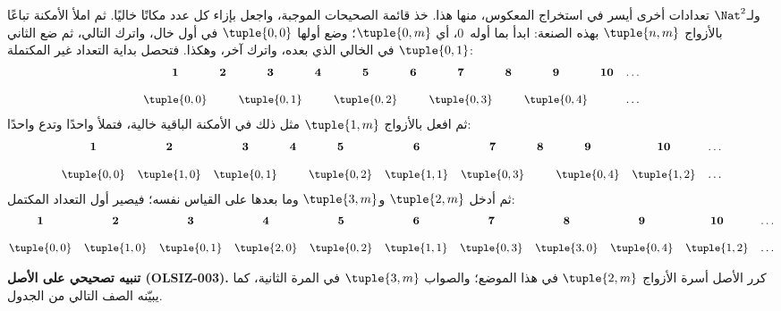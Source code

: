\documentclass[../../../include/open-logic-section]{subfiles}
\begin{document}


\begin{explain}
ولـ$\Nat^2$ تعدادات أخرى أيسر في استخراج المعكوس، منها هذا.
خذ قائمة الصحيحات الموجبة، واجعل بإزاء كل عدد مكانًا خاليًا.
ثم املأ الأمكنة تباعًا بالأزواج $\tuple{n,m}$ بهذه الصنعة:
ابدأ بما أوله~$0$، أي $\tuple{0,m}$؛ وضع أولها $\tuple{0,0}$
في أول خال، واترك التالي، ثم ضع الثاني $\tuple{0,1}$ في الخالي
الذي بعده، واترك آخر، وهكذا. فتحصل بداية التعداد غير المكتملة:
\[\small
\begin{array}{@{}c c c c c c c c c c c@{}}
\mathbf 1 & \mathbf 2 & \mathbf 3 & \mathbf 4 & \mathbf 5 & \mathbf 6 & \mathbf 7 & \mathbf 8 & \mathbf 9 & \mathbf{10} & \dots \\ \\
\tuple{0,0} &  & \tuple{0,1} &  & \tuple{0,2} &  & \tuple{0,3} & & \tuple{0,4} &  & \dots \\
\end{array}
\]
ثم افعل بالأزواج $\tuple{1,m}$ مثل ذلك في الأمكنة الباقية خالية،
فتملأ واحدًا وتدع واحدًا:
\[\small
\begin{array}{@{}c c c c c c c c c c c@{}}
\mathbf 1 & \mathbf 2 & \mathbf 3 & \mathbf 4 & \mathbf 5 & \mathbf 6 & \mathbf 7 & \mathbf 8 & \mathbf 9 & \mathbf{10} & \dots \\ \\
\tuple{0,0} & \tuple{1,0} & \tuple{0,1} &  & \tuple{0,2} & \tuple{1,1} &
\tuple{0,3} & & \tuple{0,4} &  \tuple{1,2} & \dots \\
\end{array}
\]
ثم أدخل $\tuple{2,m}$ و$\tuple{3,m}$ وما بعدها على القياس نفسه؛
فيصير أول التعداد المكتمل:
\[\small
\begin{array}{@{}cc c c c c c c c c c@{}}
\mathbf 1 & \mathbf 2 & \mathbf 3 & \mathbf 4 & \mathbf 5 & \mathbf 6 & \mathbf 7 & \mathbf 8 & \mathbf 9 & \mathbf{10} & \dots \\ \\
\tuple{0,0} & \tuple{1,0} & \tuple{0,1} & \tuple{2,0}  & \tuple{0,2} &
\tuple{1,1} & \tuple{0,3} & \tuple{3,0}  & \tuple{0,4} &  \tuple{1,2} & \dots \\
\end{array}
\]
\begin{editorial}
\textbf{تنبيه تصحيحي على الأصل (OLSIZ-003).}
كرر الأصل أسرة الأزواج $\tuple{2,m}$ في هذا الموضع؛ والصواب
$\tuple{3,m}$ في المرة الثانية، كما يبيّنه الصف التالي من الجدول.
\end{editorial}

\end{explain}
\end{document}

